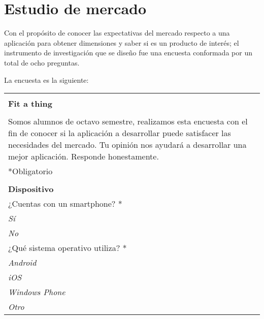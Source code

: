 \section{Estudio de mercado}
Con el propósito de conocer las expectativas del mercado respecto a una aplicación para obtener dimensiones y saber si es un producto de interés; el instrumento de investigación que se diseño fue una encuesta conformada  por un total de ocho preguntas.

La encuesta es la siguiente:

\begin{center}
    \begin{tabular}{|p{16cm}|}
        \hline
            \rowcolor[rgb]{0.1,0.1,0.1} \\
            \rowcolor[rgb]{0.1,0.1,0.1} 
            \textbf{\Large{{\color{white}Fit a thing}}} \\[0.3cm]
        \hline
        	 \\
            Somos alumnos de octavo semestre, realizamos esta encuesta con el fin de conocer si la 
            aplicación a desarrollar puede satisfacer las necesidades del mercado. Tu opinión nos ayudará
            a desarrollar una mejor aplicación. Responde honestamente.\\[0.3cm]
             \textcolor{rojo}{*Obligatorio}\\[0.3cm]
        \hline
            \rowcolor[rgb]{0.8,0.8,0.8}\\
            \rowcolor[rgb]{0.8,0.8,0.8}
            \textbf{\color{darkgray}Dispositivo} \\ [0.3cm]
        \hline
            ¿Cuentas con un smartphone? \textcolor{rojo}{*}\\
            \hspace{1cm}\textit{Sí}\\
            \hspace{1cm}\textit{No}\\
            \hline
           ¿Qué sistema operativo utiliza?  \textcolor{rojo}{*}\\
            \hspace{1cm}\textit{Android}\\
            \hspace{1cm}\textit{iOS}\\
        	 \hspace{1cm}\textit{Windows Phone}\\
        	 \hspace{1cm}\textit{Otro}\\

\end{tabular}
\end{center}
